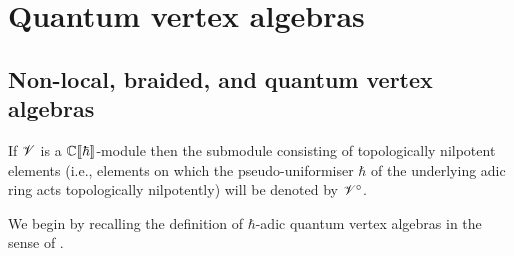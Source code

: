 \section{Quantum vertex algebras} \label{section: quantum_vertex_algebras}
    \subsection{Non-local, braided, and quantum vertex algebras}
        If $\mathscr{V}$ is a $\mathbb{C}[\![\hbar]\!]$-module then the submodule consisting of topologically nilpotent elements (i.e., elements on which the pseudo-uniformiser $\hbar$ of the underlying adic ring acts topologically nilpotently) will be denoted by $\mathscr{V}^{\circ}$. 
    
        We begin by recalling the definition of $\hbar$-adic quantum vertex algebras in the sense of \cite{etingof_kazhdan_quantisation_5}. 

